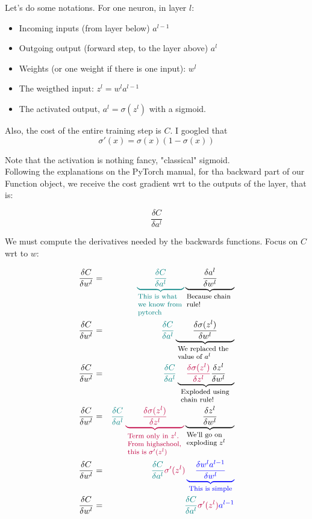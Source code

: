 \documentclass{article}
\newcommand{\explain}[2]{\underbrace{{#1}}_{\parbox{\widthof{\ensuremath{#1}}}{\footnotesize\raggedright #2}}}
\begin{document}
Let's do some notations. For one neuron, in layer $l$: 

\begin{itemize}
	\item Incoming inputs (from layer below) $a^{l-1}$ 
	\item Outgoing output (forward step, to the layer above) $a^l$ 
	\item Weights (or one weight if there is one input): $w^l$
	\item The weigthed input: $z^l =  w^l a^{l-1}$
	\item The activated output, $a^l{=}\sigma (z^l)$ with a sigmoid.
\end{itemize}

Also, the cost of the entire training step is $C$.
I googled that
\begin{equation}
	\sigma' (x){=}\sigma(x)\left(1-\sigma(x)\right)
\end{equation}

Note that the activation is nothing fancy, "classical" sigmoid.\\

Following the explanations on the PyTorch manual, for tha backward part of our Function object, we receive the cost gradient wrt to the outputs of the layer, that is:


\begin{equation}
	\frac{\delta C}{\delta a^l}
\end{equation}

We must compute the derivatives needed by the backwards functions. Focus on $C$ wrt to $w$:

\begin{eqnarray}
	\frac{\delta C}{\delta w^l}&=&\color{teal}\explain{\qquad\frac{\delta C}{\delta a^l}\qquad}{This is what we know from pytorch}
	\normalcolor\explain{\qquad\frac{\delta a^l}{\delta w^l}\qquad}{Because chain rule!}\\
	\frac{\delta C}{\delta w^l}&=&\color{teal}\frac{\delta C}{\delta a^l}
	\normalcolor \explain{\qquad\frac{\delta \sigma(z^l)}{\delta w^l}\qquad}{We replaced the value of $a^l$}\\
	\frac{\delta C}{\delta w^l}&=&\color{teal}\frac{\delta C}{\delta a^l}
	\normalcolor \explain{\quad \textcolor{purple}{\frac{\delta \sigma(z^l)}{\delta z^l}}\frac{\delta z^l}{\delta w^l}\quad}{Exploded using chain rule!}\\
	\frac{\delta C}{\delta w^l}&=&\color{teal}\frac{\delta C}{\delta a^l}
	\color{purple}\explain{\qquad\frac{\delta \sigma(z^l)}{\delta z^l}\qquad}{Term only in $z^l$. From highschool, this is $\sigma'(z^l)$} \normalcolor \explain{\qquad\frac{\delta z^l}{\delta w^l}\qquad}{We'll go on exploding $z^l$}\\	
	\frac{\delta C}{\delta w^l}&=&\color{teal}\frac{\delta C}{\delta a^l} \color{purple} \sigma'(z^l)
	\color{blue}\explain{\quad\frac{\delta w^l a^{l-1}}{\delta w^l}\quad}{This is simple}\\	
	\frac{\delta C}{\delta w^l}&=&\color{teal}\frac{\delta C}{\delta a^l} \color{purple}\sigma'(z^l) \color{blue}a^{l-1}	
\end{eqnarray}
\end{document}
